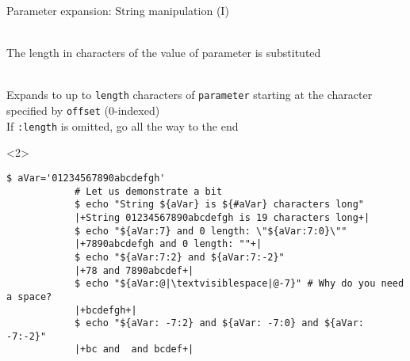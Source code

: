 \begin{frame}[fragile]{Parameter expansion: String manipulation (I)}
    \vspace{-3mm}
    \begin{description}
        \item[String Length:] \\
            {\small
                The length in characters of the value of parameter is substituted
            }
        \item[Substring Expansion:] \\
            {\small
                Expands to up to \texttt{length} characters of \texttt{parameter} starting at the character specified by \texttt{offset} (0-indexed)\\
                If \texttt{:length} is omitted, go all the way to the end\\[-0.5em]
            }
    \end{description}
    \begin{uncoverenv}<2>
        \begin{lstlisting}[style=MyBash, style=oddnumbers, aboveskip=2mm]
            $ aVar='01234567890abcdefgh'
            # Let us demonstrate a bit
            $ echo "String ${aVar} is ${#aVar} characters long"
            |+String 01234567890abcdefgh is 19 characters long+|
            $ echo "${aVar:7} and 0 length: \"${aVar:7:0}\""
            |+7890abcdefgh and 0 length: ""+|
            $ echo "${aVar:7:2} and ${aVar:7:-2}"
            |+78 and 7890abcdef+|
            $ echo "${aVar:@|\textvisiblespace|@-7}" # Why do you need a space?
            |+bcdefgh+|
            $ echo "${aVar: -7:2} and ${aVar: -7:0} and ${aVar: -7:-2}"
            |+bc and  and bcdef+|
        \end{lstlisting}
    \end{uncoverenv}
\end{frame}
